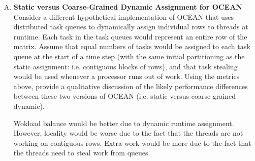 \documentclass[11pt]{article}
\newenvironment{choice}{\begin{enumerate}[A.]}{\end{enumerate}}
\newenvironment{answer}{\begin{minipage}[c][1.5in]{\textwidth}}{\end{minipage}}
\begin{document}
\begin{choice}


\item \textbf{Static versus Coarse-Grained Dynamic Assignment for OCEAN}\\
Consider a different hypothetical implementation of OCEAN that uses distributed task queues to dynamically assign individual rows to threads at runtime. Each task in the task queues would represent an entire row of the matrix. Assume that equal numbers of tasks would be assigned to each task queue at the start of a time step (with the same initial partitioning as the static assignment: i.e. contiguous blocks of rows), and that task stealing would be used whenever a processor runs out of work. Using the metrics above, provide a qualitative discussion of the likely performance differences between these two versions of OCEAN (i.e. static versus coarse-grained dynamic).

\begin{answer}
Wokload balance would be better due to dynamic runtime assignment.  \newline
However, locality would be worse due to the fact that the threads are not working on contiguous rows. \newline 
Extra work would be more due to the fact that the threads need to steal work from queues. \newline
\end{answer}

\end{choice}
\end{document}
